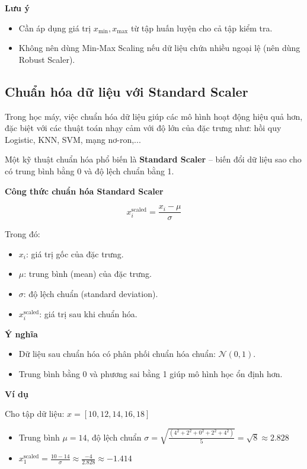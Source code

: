 \textbf{Lưu ý}

\begin{itemize}
    \item Cần áp dụng giá trị \( x_{\min}, x_{\max} \) từ tập huấn luyện cho cả tập kiểm tra.
    \item Không nên dùng Min-Max Scaling nếu dữ liệu chứa nhiều ngoại lệ (nên dùng Robust Scaler).
\end{itemize}

\subsection{Chuẩn hóa dữ liệu với Standard Scaler}
\label{scaler:standard}

Trong học máy, việc chuẩn hóa dữ liệu giúp các mô hình hoạt động hiệu quả hơn, đặc biệt với các thuật toán nhạy cảm với độ lớn của đặc trưng như: hồi quy Logistic, KNN, SVM, mạng nơ-ron,...

Một kỹ thuật chuẩn hóa phổ biến là \textbf{Standard Scaler} – biến đổi dữ liệu sao cho có trung bình bằng 0 và độ lệch chuẩn bằng 1.

\textbf{Công thức chuẩn hóa Standard Scaler}

\[
x_i^{\text{scaled}} = \frac{x_i - \mu}{\sigma}
\]

Trong đó:
\begin{itemize}
    \item \( x_i \): giá trị gốc của đặc trưng.
    \item \( \mu \): trung bình (mean) của đặc trưng.
    \item \( \sigma \): độ lệch chuẩn (standard deviation).
    \item \( x_i^{\text{scaled}} \): giá trị sau khi chuẩn hóa.
\end{itemize}

\textbf{Ý nghĩa}

\begin{itemize}
    \item Dữ liệu sau chuẩn hóa có phân phối chuẩn hóa chuẩn: \( \mathcal{N}(0, 1) \).
    \item Trung bình bằng 0 và phương sai bằng 1 giúp mô hình học ổn định hơn.
\end{itemize}

\textbf{Ví dụ}

Cho tập dữ liệu: \( x = [10, 12, 14, 16, 18] \)

\begin{itemize}
    \item Trung bình \( \mu = 14 \), độ lệch chuẩn \( \sigma = \sqrt{\frac{(4^2 + 2^2 + 0^2 + 2^2 + 4^2)}{5}} = \sqrt{8} \approx 2.828 \)
    \item \( x_1^{\text{scaled}} = \frac{10 - 14}{\sigma} \approx \frac{-4}{2.828} \approx -1.414 \)
\end{itemize}

